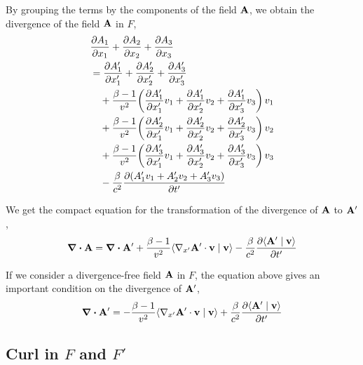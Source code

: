 \documentclass[12pt]{article}
\newcommand{\ip}[2]{\langle #1 \mid #2 \rangle}
\begin{document}
By grouping the terms by the components of the field $\vb{A}$, we obtain the divergence of
the field $\vb{A}$ in $F$,
\begin{equation}
  \begin{aligned}
    &\pdv{A_1}{x_1} + \pdv{A_2}{x_2} + \pdv{A_3}{x_3} \\
    &= \pdv{A'_1}{x'_1} + \pdv{A'_2}{x'_2} + \pdv{A'_3}{x'_3} \\
    &\quad + \frac{\beta-1}{v^2}\!\left(\pdv{A'_1}{x'_1}v_1 + \pdv{A'_1}{x'_2}v_2 + \pdv{A'_1}{x'_3}v_3\right)v_1 \\
    &\quad + \frac{\beta-1}{v^2}\!\left(\pdv{A'_2}{x'_1}v_1 + \pdv{A'_2}{x'_2}v_2 + \pdv{A'_2}{x'_3}v_3\right)v_2 \\
    &\quad + \frac{\beta-1}{v^2}\!\left(\pdv{A'_3}{x'_1}v_1 + \pdv{A'_3}{x'_2}v_2 + \pdv{A'_3}{x'_3}v_3\right)v_3 \\
    &\quad - \frac{\beta}{c^2}\pdv{(A'_1 v_1 + A'_2 v_2 + A'_3 v_3)}{t'}
  \end{aligned}
\end{equation}

We get the compact equation for the transformation of the divergence of $\vb{A}$ to $\vb{A}'$,
\begin{equation}
  \div \vb{A} = \div \vb{A}'
    + \frac{\beta-1}{v^2}\ip{\nabla_{x'}\vb{A}' \cdot \vb{v}}{\vb{v}}
    - \frac{\beta}{c^2}\pdv{\ip{\vb{A}'}{\vb{v}}}{t'}
\end{equation}

If we consider a divergence-free field $\vb{A}$ in $F$, the equation above gives an important
condition on the divergence of $\vb{A}'$,
\begin{equation}
  \div \vb{A}' = -\frac{\beta-1}{v^2}\ip{\nabla_{x'}\vb{A}' \cdot \vb{v}}{\vb{v}}
    + \frac{\beta}{c^2}\pdv{\ip{\vb{A}'}{\vb{v}}}{t'}
  \label{eq:divergence_in_Fprime}
\end{equation}

\subsection{Curl in $F$ and $F'$}
\end{document}
